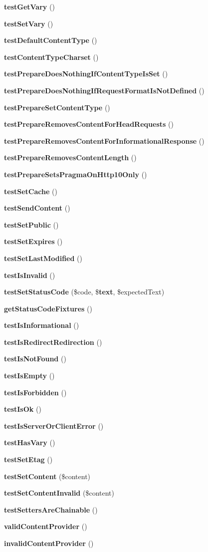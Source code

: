 \begin{DoxyCompactItemize}
{\bf test\+Get\+Vary} ()
\item 
{\bf test\+Set\+Vary} ()
\item 
{\bf test\+Default\+Content\+Type} ()
\item 
{\bf test\+Content\+Type\+Charset} ()
\item 
{\bf test\+Prepare\+Does\+Nothing\+If\+Content\+Type\+Is\+Set} ()
\item 
{\bf test\+Prepare\+Does\+Nothing\+If\+Request\+Format\+Is\+Not\+Defined} ()
\item 
{\bf test\+Prepare\+Set\+Content\+Type} ()
\item 
{\bf test\+Prepare\+Removes\+Content\+For\+Head\+Requests} ()
\item 
{\bf test\+Prepare\+Removes\+Content\+For\+Informational\+Response} ()
\item 
{\bf test\+Prepare\+Removes\+Content\+Length} ()
\item 
{\bf test\+Prepare\+Sets\+Pragma\+On\+Http10\+Only} ()
\item 
{\bf test\+Set\+Cache} ()
\item 
{\bf test\+Send\+Content} ()
\item 
{\bf test\+Set\+Public} ()
\item 
{\bf test\+Set\+Expires} ()
\item 
{\bf test\+Set\+Last\+Modified} ()
\item 
{\bf test\+Is\+Invalid} ()
\item 
{\bf test\+Set\+Status\+Code} (\$code, \${\bf text}, \$expected\+Text)
\item 
{\bf get\+Status\+Code\+Fixtures} ()
\item 
{\bf test\+Is\+Informational} ()
\item 
{\bf test\+Is\+Redirect\+Redirection} ()
\item 
{\bf test\+Is\+Not\+Found} ()
\item 
{\bf test\+Is\+Empty} ()
\item 
{\bf test\+Is\+Forbidden} ()
\item 
{\bf test\+Is\+Ok} ()
\item 
{\bf test\+Is\+Server\+Or\+Client\+Error} ()
\item 
{\bf test\+Has\+Vary} ()
\item 
{\bf test\+Set\+Etag} ()
\item 
{\bf test\+Set\+Content} (\$content)
\item 
{\bf test\+Set\+Content\+Invalid} (\$content)
\item 
{\bf test\+Setters\+Are\+Chainable} ()
\item 
{\bf valid\+Content\+Provider} ()
\item 
{\bf invalid\+Content\+Provider} ()
\end{DoxyCompactItemize}

